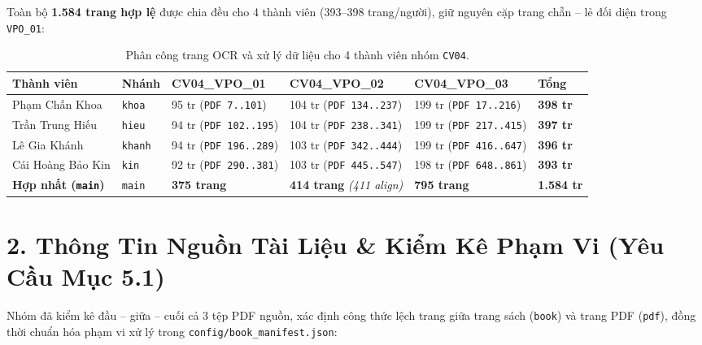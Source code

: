 \documentclass[11pt,a4paper]{article}
\begin{document}
Toàn bộ \textbf{1.584 trang hợp lệ} được chia đều cho 4 thành viên (393--398 trang/người), giữ nguyên cặp trang chẵn -- lẻ đối diện trong \texttt{VPO\_01}:

\vspace{0.15em}
\begin{table}[h!]
\centering
\small
\begin{tabular}{L{3.5cm} C{1.3cm} L{2.8cm} L{2.8cm} L{2.8cm} C{1.6cm}}
\toprule
\textbf{Thành viên} & \textbf{Nhánh} & \textbf{CV04\_VPO\_01} & \textbf{CV04\_VPO\_02} & \textbf{CV04\_VPO\_03} & \textbf{Tổng} \\
\midrule
Phạm Chấn Khoa      & \texttt{khoa}  & 95 tr (\texttt{PDF 7..101})   & 104 tr (\texttt{PDF 134..237}) & 199 tr (\texttt{PDF 17..216})  & \textbf{398 tr} \\
Trần Trung Hiếu     & \texttt{hieu}  & 94 tr (\texttt{PDF 102..195}) & 104 tr (\texttt{PDF 238..341}) & 199 tr (\texttt{PDF 217..415}) & \textbf{397 tr} \\
Lê Gia Khánh        & \texttt{khanh} & 94 tr (\texttt{PDF 196..289}) & 103 tr (\texttt{PDF 342..444}) & 199 tr (\texttt{PDF 416..647}) & \textbf{396 tr} \\
Cái Hoàng Bảo Kin   & \texttt{kin}   & 92 tr (\texttt{PDF 290..381}) & 103 tr (\texttt{PDF 445..547}) & 198 tr (\texttt{PDF 648..861}) & \textbf{393 tr} \\
\midrule
\textbf{Hợp nhất (\texttt{main})} & \texttt{main} & \textbf{375 trang} & \textbf{414 trang} \textit{(411 align)} & \textbf{795 trang} & \textbf{1.584 tr} \\
\bottomrule
\end{tabular}
\caption{Phân công trang OCR và xử lý dữ liệu cho 4 thành viên nhóm \texttt{CV04}.}
\end{table}


\section{2. Thông Tin Nguồn Tài Liệu \& Kiểm Kê Phạm Vi (Yêu Cầu Mục 5.1)}

Nhóm đã kiểm kê đầu -- giữa -- cuối cả 3 tệp PDF nguồn, xác định công thức lệch trang giữa trang sách (\texttt{book}) và trang PDF (\texttt{pdf}), đồng thời chuẩn hóa phạm vi xử lý trong \texttt{config/book\_manifest.json}:
\end{document}
